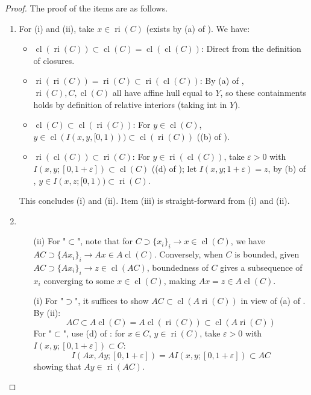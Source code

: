 \begin{proof}The proof of the items are as follows.
	\begin{enumerate}[label=(\alph*)]
		\item For (i) and (ii), take $x\in \operatorname{ri}(C)$ (exists by (a) of ). We have:
		      \begin{itemize}
			      \item $\operatorname{cl}(\operatorname{ri}(C))\subset\operatorname{cl}(C)=\operatorname{cl}(\operatorname{cl}(C))$: Direct from the definition of closures.
			      \item $\operatorname{ri}(\operatorname{ri}(C))=\operatorname{ri}(C)\subset\operatorname{ri}(\operatorname{cl}(C))$: By (a) of , $\operatorname{ri}(C),C,\operatorname{cl}(C)$ all have affine hull equal to $Y$, so these containments holds by definition of relative interiors (taking int in $Y$).
			      \item $\operatorname{cl}(C)\subset \operatorname{cl}(\operatorname{ri}(C))$: For $y\in \operatorname{cl}(C)$, $y\in \operatorname{cl}(I(x,y,[0, 1)))\subset \operatorname{cl}(\operatorname{ri}(C))$ ((b) of ).
			      \item $\operatorname{ri}(\operatorname{cl}(C))\subset \operatorname{ri}(C)$: For $y\in \operatorname{ri}(\operatorname{cl}(C))$, take $\varepsilon>0$ with $I(x,y;[0,1+\varepsilon ])\subset \operatorname{cl}(C)$ ((d) of ); let $I(x,y;1+\varepsilon)=z$, by (b) of , $y\in I(x,z;[0, 1))\subset \operatorname{ri}(C)$.
		      \end{itemize}
		      This concludes (i) and (ii). Item (iii) is straight-forward from (i) and (ii).
		\item
		      \begin{itemize}
			      \item[(ii)] For "$\subset$", note that for $C\supset \{x_i\}_i\to x\in \operatorname{cl}(C)$, we have $AC\supset \{Ax_i\}_{i}\to Ax\in A\operatorname{cl}(C)$. Conversely, when $C$ is bounded, given $AC\supset \{Ax_i\}_i\to z\in \operatorname{cl}(AC)$, boundedness of $C$ gives a subsequence of $x_i$ converging to some $x\in \operatorname{cl}(C)$, making $Ax=z\in A\operatorname{cl}(C)$.
			      \item[(i)] For "$\supset$", it suffices to show $AC\subset \operatorname{cl}(A \operatorname{ri}(C))$ in view of (a) of . By (ii):
			            \[
				            AC\subset A \operatorname{cl}(C) = A\operatorname{cl}(\operatorname{ri}(C)) \subset \operatorname{cl}(A \operatorname{ri}(C))
			            \]
			            For "$\subset$", use (d) of : for $x\in C$, $y\in \operatorname{ri}(C)$, take $\varepsilon >0$ with $I(x,y;[0,1+\varepsilon ])\subset C$:
			            \[
				            I(Ax,Ay;[0,1+\varepsilon ])=AI(x,y;[0,1+\varepsilon ])\subset AC
			            \]
			            showing that $Ay\in \operatorname{ri}(AC)$.
		      \end{itemize}
	\end{enumerate}
\end{proof}

